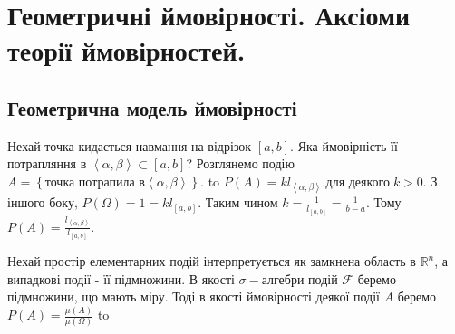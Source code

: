 
\newlength\Radius
\setlength\Radius{2cm}

\section{Геометричні ймовірності. Аксіоми теорії ймовірностей.}
\subsection{Геометрична модель ймовірності}
\begin{example}
    Нехай точка кидається навмання на відрізок $\left[a, b\right]$. 
    Яка ймовірність її 
    потрапляння в $\left<\alpha, \beta\right> \subset  \left[a, b\right]$?
    \newline
    Розглянемо подію $A = \left\{ 
        \text{точка потрапила в} \left<\alpha, \beta\right>
    \right\}$.
    \newline
    \hbox to 
    $P(A) = kl_{\left<\alpha, \beta\right>}\; \text{для деякого}\; k > 0$.
    З іншого боку, $P(\Omega) = 1 = kl_{\left[a, b\right]}$. Таким чином 
    $k = \frac{1}{l_{\left[a, b\right]}} = \frac{1}{b-a}$.
    Тому $P(A) = \frac{l_{\left<\alpha, \beta\right>}}{l_{\left[a, b\right]}}$.
\end{example}
Нехай простір елементарних подій інтерпретується як замкнена область в 
$ \mathbb{R} ^n$, а випадкові події - її підмножини. В якості $\sigma-\text{алгебри}$ 
подій $\mathcal{F}$ беремо підмножини, що мають міру. Тоді в якості ймовірності 
деякої події $A$ беремо $P(A) = \frac{\mu(A)}{\mu(\Omega)}$
\newline
\hbox to 
